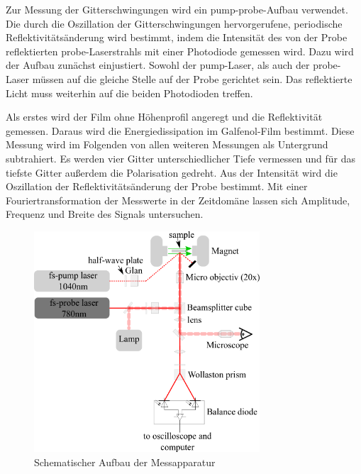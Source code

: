 Zur Messung der Gitterschwingungen wird ein pump-probe-Aufbau verwendet. Die durch die Oszillation der Gitterschwingungen hervorgerufene, periodische Reflektivitätsänderung wird bestimmt, indem die Intensität des von der Probe reflektierten probe-Laserstrahls mit einer Photodiode gemessen wird. Dazu wird der Aufbau zunächst einjustiert. Sowohl der pump-Laser, als auch der probe-Laser müssen auf die gleiche Stelle auf der Probe gerichtet sein. Das reflektierte Licht muss weiterhin auf die beiden Photodioden treffen.\par
Als erstes wird der Film ohne Höhenprofil angeregt und die Reflektivität gemessen. Daraus wird die Energiedissipation im Galfenol-Film bestimmt. Diese Messung wird im Folgenden von allen weiteren Messungen als Untergrund subtrahiert. Es werden vier Gitter unterschiedlicher Tiefe vermessen und für das tiefste Gitter außerdem die Polarisation gedreht. Aus der Intensität wird die Oszillation der Reflektivitätsänderung der Probe bestimmt. Mit einer Fouriertransformation der Messwerte in der Zeitdomäne lassen sich Amplitude, Frequenz und Breite des Signals untersuchen.
\begin{figure}
  \centering
  \includegraphics[width=0.75\textwidth]{img/aufbau.png}
  \caption{Schematischer Aufbau der Messapparatur \cite{FP}}
  \label{aufbau}
\end{figure}

\FloatBarrier
